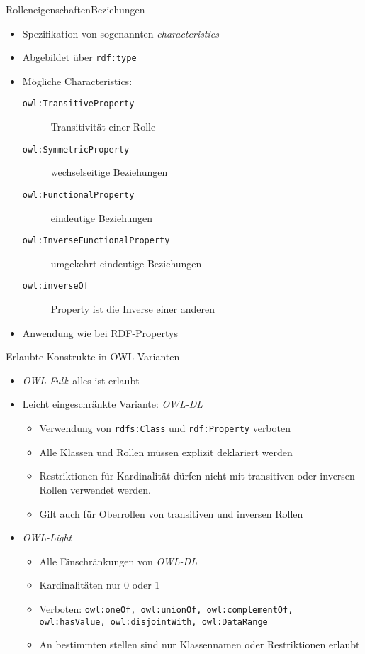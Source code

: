 \documentclass{beamer}
\begin{document}
%
\begin{frame}[fragile]{Rolleneigenschaften}{Beziehungen}
\begin{itemize}
\item Spezifikation von sogenannten \emph{characteristics}
\item Abgebildet über \texttt{rdf:type}
\item Mögliche Characteristics:
\begin{description}
\item[\texttt{owl:TransitiveProperty}] Transitivität einer Rolle
\item[\texttt{owl:SymmetricProperty}] wechselseitige Beziehungen
\item[\texttt{owl:FunctionalProperty}] eindeutige Beziehungen
\item[\texttt{owl:InverseFunctionalProperty}] umgekehrt eindeutige Beziehungen
\item[\texttt{owl:inverseOf}] Property ist die Inverse einer anderen 


\end{description}
\item Anwendung wie bei RDF-Propertys
\end{itemize}
\end{frame}


\begin{frame}{Erlaubte Konstrukte in OWL-Varianten}
\begin{itemize}
\item \emph{OWL-Full}: alles ist erlaubt
\item Leicht eingeschränkte Variante: \emph{OWL-DL}
\begin{itemize}
\item Verwendung von \texttt{rdfs:Class} und \texttt{rdf:Property} verboten
\item Alle Klassen und Rollen müssen explizit deklariert werden
\item Restriktionen für Kardinalität dürfen nicht mit transitiven oder
inversen Rollen verwendet werden.
\item Gilt auch für Oberrollen von transitiven und inversen Rollen
\end{itemize}
\item \emph{OWL-Light}
\begin{itemize}
\item Alle Einschränkungen von \emph{OWL-DL}
\item Kardinalitäten nur 0 oder 1
\item Verboten: \texttt{owl:oneOf, owl:unionOf, owl:complementOf,
owl:hasValue, owl:disjointWith, owl:DataRange}
\item An bestimmten stellen sind nur Klassennamen oder Restriktionen
erlaubt
\end{itemize}
\end{itemize}
\end{frame} 
\end{document}
